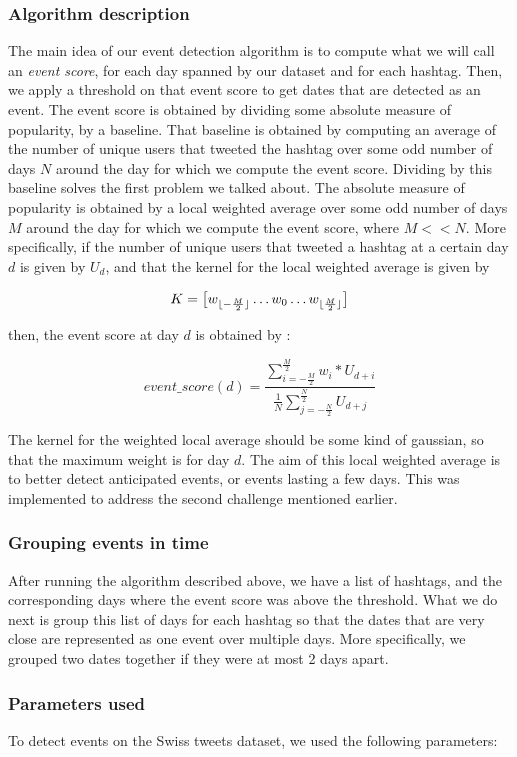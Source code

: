 \documentclass[11pt]{article}
\DeclarePairedDelimiter\floor{\lfloor}{\rfloor}
\begin{document}
\subsubsection{Algorithm description}
The main idea of our event detection algorithm is to compute what we will call an \textit{event score}, for each day spanned by our dataset and for each hashtag. Then, we apply a threshold on that event score to get dates that are detected as an event.
The event score is obtained by dividing some absolute measure of popularity, by a baseline. That baseline is obtained by computing an average of the number of unique users that tweeted the hashtag over some odd number of days $N$ around the day for which we compute the event score. Dividing by this baseline solves the first problem we talked about. The absolute measure of popularity is obtained by a local weighted average over some odd number of days $M$ around the day for which we compute the event score, where $M << N$.
More specifically, if the number of unique users that tweeted a hashtag at a certain day $d$ is given by $U_d$, and that the kernel for the local weighted average is given by 

$$ K = \big[ w_{ \floor{ -\frac{M}{2} } }  \dots w_{0}  \dots  w_{ \floor{ \frac{M}{2} } } \big] $$

then, the event score at day $d$ is obtained by :

$$ 
event\_score(d) =  \frac {\sum_{i=-\frac{M}{2}}^{\frac{M}{2}} w_i * U_{d + i} }
				    {\frac{1}{N} \sum_{j=-\frac{N}{2}}^{\frac{N}{2}}  U_{d + j} }
$$

The kernel for the weighted local average should be some kind of gaussian, so that the maximum weight is for day $d$. The aim of this local weighted average is to better detect anticipated events, or events lasting a few days. This was implemented to address the second challenge mentioned earlier. 

\subsubsection{Grouping events in time}
After running the algorithm described above, we have a list of hashtags, and the corresponding days where the event score was above the threshold. What we do next is group this list of days for each hashtag so that the dates that are very close are represented as one event over multiple days. More specifically, we grouped two dates together if they were at most 2 days apart.

\subsubsection{Parameters used}
To detect events on the Swiss tweets dataset, we used the following parameters:
\end{document}
